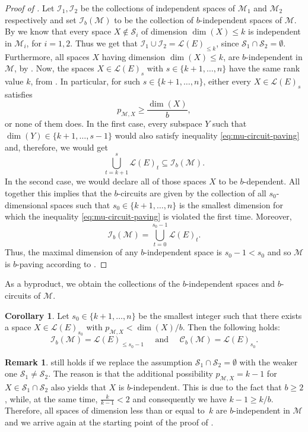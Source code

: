 \documentclass[a4paper,11pt,reqno]{amsart}
\theoremstyle{definition}
\newtheorem{remark}[theorem]{{{Remark}}}
\newtheorem{corollary}[theorem]{{{Corollary}}}%
\newcommand{\C}{\mathcal C}
\newcommand{\mM}{\mathcal{M}}
\newcommand{\mL}{\mathcal{L}}
\newcommand{\mI}{\mathcal{I}}
\newcommand{\mS}{\mathcal{S}}
\begin{document}
{\begin{proof}[Proof of ]
    Let $\mI_1,\mI_2$ be the collections of independent spaces of $\mM_1$ and $\mM_2$ respectively and set $\mI_b(\mM)$ to be the collection of $b$-independent spaces of $\mM$. By  we know that every space $X\not\in\mS_i$ of dimension $\dim(X)\leq k$ is independent in $\mM_i$, for $i=1,2$. Thus we get that $\mI_1\cup\mI_2=\mL(E)_{\leq k}$, since $\mS_1\cap\mS_2=\emptyset$. Furthermore, all spaces $X$ having dimension $\dim(X)\leq k$, are $b$-independent in $\mM$, by . Now, the spaces $X\in\mL(E)_s$ with $s\in\{k+1,\ldots,n\}$ have the same rank value $k$,  from . In particular, for such $s\in\{k+1,\ldots,n\}$,  either every $X\in\mL(E)_s$ satisfies
    \begin{equation}\label{eq:mu-circuit-paving}
        p_{\mM,X}\geq\frac{\dim(X)}{b},
    \end{equation}
    or none of them does. In the first case, every subspace $Y$ such that $\dim(Y)\in\{k+1,\ldots,s-1\}$ would also satisfy inequality \eqref{eq:mu-circuit-paving} and, therefore, we would get
    \[ \bigcup_{t=k+1}^s\mL(E)_t\subseteq\mI_b(\mM).
    \]
    In the second case, we would declare all of those spaces $X$ to be $b$-dependent. All together this implies that the $b$-circuits are given by the collection of all $s_0$-dimensional spaces such that $s_0\in\{k+1,\ldots,n\}$ is the smallest dimension for which the inequality \eqref{eq:mu-circuit-paving} is violated the first time. Moreover, 
    $$\mI_b(\mM)=\bigcup_{t=0}^{s_0-1}\mL(E)_t.         
    $$
    Thus, the maximal dimension of any $b$-independent space is $s_0-1<s_0$ and so $\mM$ is $b$-paving according to .
\end{proof}

As a byproduct, we obtain the collections of the $b$-independent spaces and $b$-circuits of $\mM$.

\begin{corollary}
    Let $s_0\in\{k+1,\ldots,n\}$ be the smallest integer such that there exists a space $X\in\mL(E)_{s_0}$ with $p_{\mM,X}<\dim(X)/b$. Then the following holds:
    \[
        \mI_b(\mM)=\mL(E)_{\leq s_0-1} \quad \text{ and } \quad \C_b(\mM)=\mL(E)_{s_0}. 
    \]
\end{corollary}

\begin{remark}
     still holds if we replace the assumption $\mS_1\cap\mS_2=\emptyset$ with the weaker one $\mS_1\not=\mS_2$. The reason is that the additional possibility $p_{\mM,X}=k-1$ for $X\in\mS_1\cap\mS_2$ also yields that $X$ is $b$-independent. This is due to the fact that $b\geq 2$, while, at the same time, $\frac{k}{k-1}<2$ and consequently we have $k-1\geq k/b$. Therefore, all spaces of dimension less than or equal to~$k$ are $b$-independent in $\mM$ and we arrive again at the starting point of the proof of .
\end{remark}

}
\end{document}
